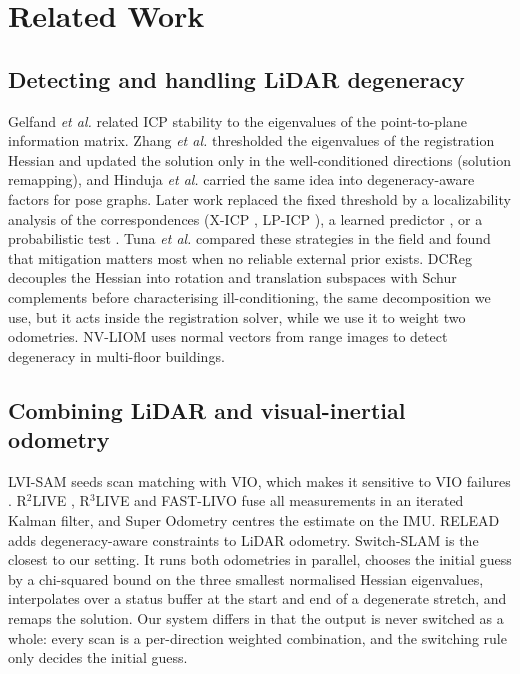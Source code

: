 \documentclass[journal]{IEEEtran}
\begin{document}
\section{Related Work}
\subsection{Detecting and handling LiDAR degeneracy}
Gelfand \emph{et al.} \cite{gelfand2003} related ICP stability to the eigenvalues of the point-to-plane information matrix. Zhang \emph{et al.} \cite{zhang2016} thresholded the eigenvalues of the registration Hessian and updated the solution only in the well-conditioned directions (solution remapping), and Hinduja \emph{et al.} \cite{hinduja2019} carried the same idea into degeneracy-aware factors for pose graphs. Later work replaced the fixed threshold by a localizability analysis of the correspondences (X-ICP \cite{xicp2024}, LP-ICP \cite{lpicp2025}), a learned predictor \cite{nubert2022}, or a probabilistic test \cite{hatleskog2024}. Tuna \emph{et al.} \cite{tuna2025} compared these strategies in the field and found that mitigation matters most when no reliable external prior exists. DCReg \cite{dcreg2026} decouples the Hessian into rotation and translation subspaces with Schur complements before characterising ill-conditioning, the same decomposition we use, but it acts inside the registration solver, while we use it to weight two odometries. NV-LIOM \cite{nvliom2024} uses normal vectors from range images to detect degeneracy in multi-floor buildings.

\subsection{Combining LiDAR and visual-inertial odometry}
LVI-SAM \cite{lvisam2021} seeds scan matching with VIO, which makes it sensitive to VIO failures \cite{switchslam2024}. R$^2$LIVE \cite{r2live2021}, R$^3$LIVE \cite{r3live2022} and FAST-LIVO \cite{fastlivo2022} fuse all measurements in an iterated Kalman filter, and Super Odometry \cite{superodom2021} centres the estimate on the IMU. RELEAD \cite{relead2024} adds degeneracy-aware constraints to LiDAR odometry. Switch-SLAM \cite{switchslam2024} is the closest to our setting. It runs both odometries in parallel, chooses the initial guess by a chi-squared bound on the three smallest normalised Hessian eigenvalues, interpolates over a status buffer at the start and end of a degenerate stretch, and remaps the solution. Our system differs in that the output is never switched as a whole: every scan is a per-direction weighted combination, and the switching rule only decides the initial guess.
\end{document}
